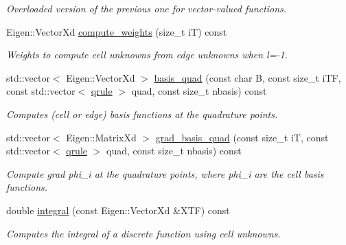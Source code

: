 \begin{DoxyCompactItemize}
\begin{DoxyCompactList}\small\item\em Overloaded version of the previous one for vector-\/valued functions. \end{DoxyCompactList}\item 
\mbox{\label{classHArDCore2D_1_1HybridCore_a06825c5d156026d465a2798389aa952b}} 
Eigen\+::\+Vector\+Xd \hyperlink{classHArDCore2D_1_1HybridCore_a06825c5d156026d465a2798389aa952b}{compute\+\_\+weights} (size\+\_\+t iT) const
\begin{DoxyCompactList}\small\item\em Weights to compute cell unknowns from edge unknowns when l=-\/1. \end{DoxyCompactList}\item 
std\+::vector$<$ Eigen\+::\+Vector\+Xd $>$ \hyperlink{classHArDCore2D_1_1HybridCore_adc7afe2ff1f5a56ebe48b407bdf08d6e}{basis\+\_\+quad} (const char B, const size\+\_\+t i\+TF, const std\+::vector$<$ \hyperlink{structHArDCore2D_1_1HybridCore_1_1qrule}{qrule} $>$ quad, const size\+\_\+t nbasis) const
\begin{DoxyCompactList}\small\item\em Computes (cell or edge) basis functions at the quadrature points. \end{DoxyCompactList}\item 
std\+::vector$<$ Eigen\+::\+Matrix\+Xd $>$ \hyperlink{classHArDCore2D_1_1HybridCore_a14adb4f4cfdd2dc7f9be9bfd085e7d87}{grad\+\_\+basis\+\_\+quad} (const size\+\_\+t iT, const std\+::vector$<$ \hyperlink{structHArDCore2D_1_1HybridCore_1_1qrule}{qrule} $>$ quad, const size\+\_\+t nbasis) const
\begin{DoxyCompactList}\small\item\em Compute \textquotesingle{}grad phi\+\_\+i\textquotesingle{} at the quadrature points, where phi\+\_\+i are the cell basis functions. \end{DoxyCompactList}\item 
\mbox{\label{classHArDCore2D_1_1HybridCore_aed85cdfc0bb96c65ce201528366e92f8}} 
double \hyperlink{classHArDCore2D_1_1HybridCore_aed85cdfc0bb96c65ce201528366e92f8}{integral} (const Eigen\+::\+Vector\+Xd \&X\+TF) const
\begin{DoxyCompactList}\small\item\em Computes the integral of a discrete function using cell unknowns. \end{DoxyCompactList}\item 

\end{DoxyCompactItemize}
